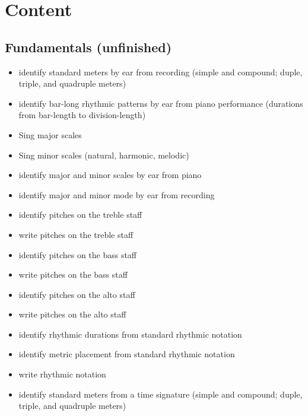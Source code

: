 \chapter{Content}
\label{content}

\section{Fundamentals (unfinished)}
\label{fundamentalsunfinished}

\begin{itemize}
\item identify standard meters by ear from recording (simple and compound; duple, triple, and quadruple meters)

\item identify bar-long rhythmic patterns by ear from piano performance (durations from bar-length to division-length)

\item Sing major scales

\item Sing minor scales (natural, harmonic, melodic)

\item identify major and minor scales by ear from piano

\item identify major and minor mode by ear from recording

\item identify pitches on the treble staff

\item write pitches on the treble staff

\item identify pitches on the bass staff

\item write pitches on the bass staff

\item identify pitches on the alto staff

\item write pitches on the alto staff

\item identify rhythmic durations from standard rhythmic notation

\item identify metric placement from standard rhythmic notation

\item write rhythmic notation

\item identify standard meters from a time signature (simple and compound; duple, triple, and quadruple meters)


\end{itemize}
